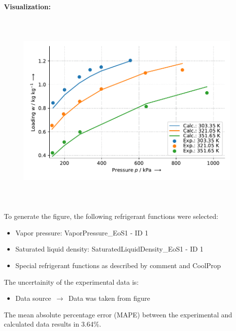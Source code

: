 \textbf{Visualization:}
%
\begin{figure}[!htp]
{\noindent\includegraphics[height=10cm, keepaspectratio]{figs/ads/ads_R-134a_activated_carbon_fiber_A-20_DubininAstakhov_2.pdf}}
\end{figure}
%

To generate the figure, the following refrigerant functions were selected:
\begin{itemize}
\item Vapor pressure: VaporPressure\_EoS1 - ID 1
\item Saturated liquid density: SaturatedLiquidDensity\_EoS1 - ID 1
\item Special refrigerant functions as described by comment and CoolProp
\end{itemize}

The uncertainity of the experimental data is:
\begin{itemize}
\item Data source $\,\to\,$ Data was taken from figure
\end{itemize}

The mean absolute percentage error (MAPE) between the experimental and calculated data results in 3.64\%.
\FloatBarrier
\newpage
